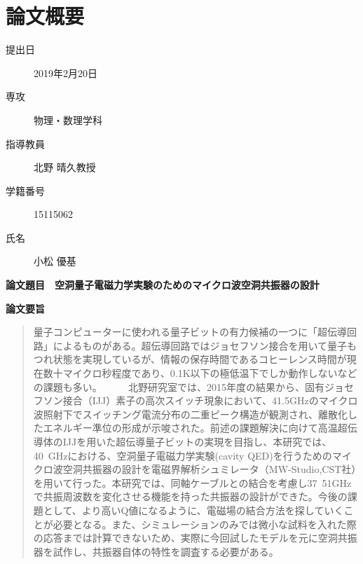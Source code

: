 \chapter*{論文概要}
\thispagestyle{empty}

\begin{description}
  \item[提出日] 2019年2月20日
  \item[専攻] 物理・数理学科
  \item[指導教員] 北野 晴久教授
  \item[学籍番号] 15115062
  \item[氏名] 小松 優基
\end{description}
\textbf{論文題目}　\textbf{空洞量子電磁力学実験のためのマイクロ波空洞共振器の設計}\\
\thispagestyle{empty}

\textbf{論文要旨}

\begin{abstract}
量子コンピューターに使われる量子ビットの有力候補の一つに「超伝導回路」によるものがある。超伝導回路ではジョセフソン接合を用いて量子もつれ状態を実現しているが、情報の保存時間であるコヒーレンス時間が現在数十マイクロ秒程度であり、0.1K以下の極低温下でしか動作しないなどの課題も多い。
　
　北野研究室では、2015年度の結果から、固有ジョセフソン接合（IJJ）素子の高次スイッチ現象において、41.5GHzのマイクロ波照射下でスイッチング電流分布の二重ピーク構造が観測され、離散化したエネルギー準位の形成が示唆された。前述の課題解決に向けて高温超伝導体のIJJを用いた超伝導量子ビットの実現を目指し、本研究では、40~GHzにおける、空洞量子電磁力学実験(cavity QED)を行うためのマイクロ波空洞共振器の設計を電磁界解析シュミレータ（MW-Studio,CST社）を用いて行った。本研究では、同軸ケーブルとの結合を考慮し37~51GHzで共振周波数を変化させる機能を持った共振器の設計ができた。今後の課題として、より高いQ値になるように、電磁場の結合方法を探していくことが必要となる。また、シミュレーションのみでは微小な試料を入れた際の応答までは計算できないため、実際に今回試したモデルを元に空洞共振器を試作し、共振器自体の特性を調査する必要がある。
\end{abstract}
